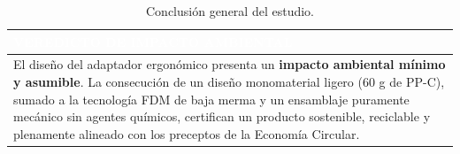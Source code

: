 \documentclass[11pt,a4paper]{article}
\begin{document}
\begin{table}[H]
    \centering
    \small
    \renewcommand{\arraystretch}{1.6}
    \renewcommand{\tabularxcolumn}[1]{m{#1}}
    \begin{tabularx}{\linewidth}{|>{\centering\arraybackslash}X|}
        \hline
        \rowcolor{ArthroNavy}
        \textcolor{white}{\Large\textbf{VEREDICTO DE IMPACTO AMBIENTAL}} \\ 
        \hline
        \cellcolor{ArthroTeal!5}
        \vspace{0.2cm}
        El diseño del adaptador ergonómico presenta un \textbf{impacto ambiental mínimo y asumible}. La consecución de un diseño monomaterial ligero (60 g de PP-C), sumado a la tecnología FDM de baja merma y un ensamblaje puramente mecánico sin agentes químicos, certifican un producto sostenible, reciclable y plenamente alineado con los preceptos de la Economía Circular.
        \vspace{0.2cm} \\ 
        \hline
    \end{tabularx}
    \caption{Conclusión general del estudio.}
\end{table}


\vspace{1.5cm}
\end{document}
